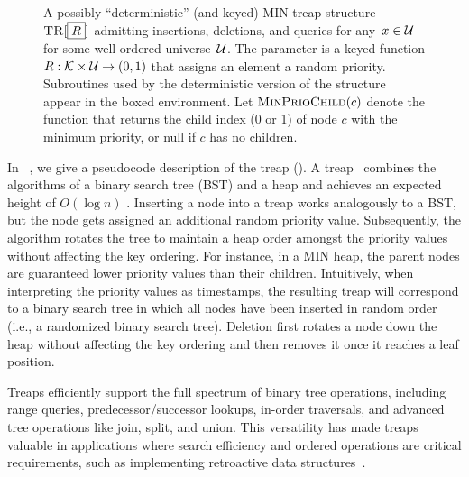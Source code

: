 \begin{figure*}[h]
\begin{pchstack}[boxed,center,space=0.5em]
\begin{pcvstack}[space=0.45em]
{                }
        \end{pcvstack}	
    \end{pchstack}
    \caption[Treap Structure.]{A possibly ``deterministic'' (and keyed) MIN treap structure $\textnormal{\textsc{TR}}[\boxed{R}]$ admitting insertions, deletions, and queries for any~$x \in \mathcal{U}$ for some well-ordered universe~$\mathcal{U}$. The parameter is a keyed function $R: \mathcal{K} \times \mathcal{U} \to (0,1)$ that assigns an element a random priority. Subroutines used by the deterministic version of the structure appear in the boxed environment. Let $\textnormal{\textsc{MinPrioChild}}(c)$ denote the function that returns the child index (0 or 1) of node $c$ with the minimum priority, or null if $c$ has no children.} 
    \label{fig:treap}
\end{figure*}

In~ , we give a pseudocode description of the treap (\TR).
A treap~\cite{aragon1989randomized} combines the algorithms of a binary search tree (BST) and a heap and achieves an expected height of $O(\log n)$ \cite{aragon1989randomized}.
Inserting a node into a treap works analogously to a BST, but the node gets assigned an additional random priority value.
Subsequently, the algorithm rotates the tree to maintain a heap order amongst the priority values without affecting the key ordering.
For instance, in a MIN heap, the parent nodes are guaranteed lower priority values than their children.
Intuitively, when interpreting the priority values as timestamps, the resulting treap will correspond to a binary search tree in which all nodes have been inserted in random order (i.e., a randomized binary search tree). 
Deletion first rotates a node down the heap without affecting the key ordering and then removes it once it reaches a leaf position. 

Treaps efficiently support the full spectrum of binary tree operations, including range queries, predecessor/successor lookups, in-order traversals, and advanced tree operations like join, split, and union. This versatility has made treaps valuable in applications where search efficiency and ordered operations are critical requirements, such as implementing retroactive data structures~\cite{demaine2007retroactive}.